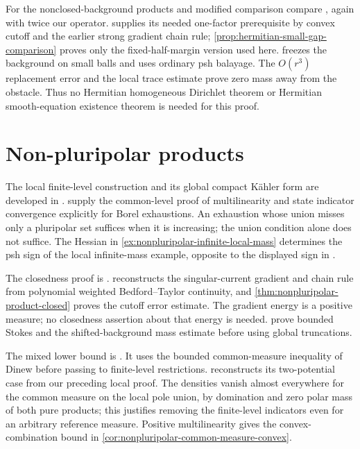 For the nonclosed-background products and modified comparison compare \cite[Section 1, pp.~3--4, and Theorem 2.3 and complete proof, pp.~5--6]{KN2015v2}, again with twice our operator.  supplies its needed one-factor prerequisite by convex cutoff and the earlier strong gradient chain rule; \cref{prop:hermitian-small-gap-comparison} proves only the fixed-half-margin version used here.  freezes the background on small balls and uses ordinary psh balayage. The $O(r^3)$ replacement error and the local trace estimate prove zero mass away from the obstacle. Thus no Hermitian homogeneous Dirichlet theorem or Hermitian smooth-equation existence theorem is needed for this proof.

\section{Non-pluripolar products}\label{sec:history-nonpluripolar}
The local finite-level construction and its global compact K\"ahler form are developed in \cite[Section 1.2, Proposition 1.4, Lemma 1.5 and Proposition 1.6, pp.~203--207]{BEGZ10}.  supply the common-level proof of multilinearity and state indicator convergence explicitly for Borel exhaustions. An exhaustion whose union misses only a pluripolar set suffices when it is increasing; the union condition alone does not suffice. The Hessian in \cref{ex:nonpluripolar-infinite-local-mass} determines the psh sign of the local infinite-mass example, opposite to the displayed sign in \cite[Example 1.3, pp.~204--205]{BEGZ10}.

The closedness proof is \cite[Theorem 1.8 and Lemma 1.9, pp.~207--210]{BEGZ10}.  reconstructs the singular-current gradient and chain rule from polynomial weighted Bedford--Taylor continuity, and \cref{thm:nonpluripolar-product-closed} proves the cutoff error estimate. The gradient energy is a positive measure; no closedness assertion about that energy is needed.  prove bounded Stokes and the shifted-background mass estimate before using global truncations.

The mixed lower bound is \cite[Proposition 1.11 and complete proof, p.~211]{BEGZ10}. It uses the bounded common-measure inequality of Dinew before passing to finite-level restrictions.  reconstructs its two-potential case from our preceding local proof. The densities vanish almost everywhere for the common measure on the local pole union, by domination and zero polar mass of both pure products; this justifies removing the finite-level indicators even for an arbitrary reference measure. Positive multilinearity gives the convex-combination bound in \cref{cor:nonpluripolar-common-measure-convex}.

